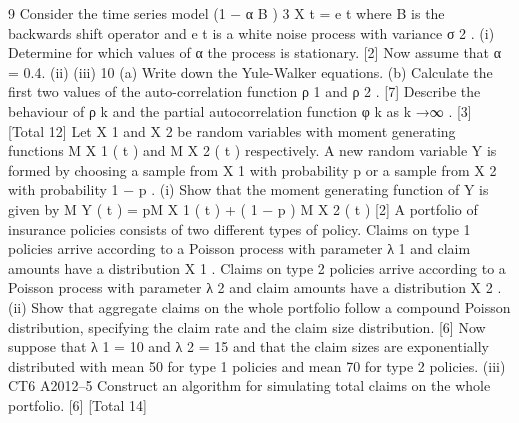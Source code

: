 \documentclass[a4paper,12pt]{article}
\begin{document}
\begin{enumerate}
9
Consider the time series model
(1 − α B ) 3 X t = e t
where B is the backwards shift operator and e t is a white noise process with variance
σ 2 .
(i)
Determine for which values of α the process is stationary.
[2]
Now assume that α = 0.4.
(ii)
(iii)
10
(a) Write down the Yule-Walker equations.
(b) Calculate the first two values of the auto-correlation function ρ 1 and
ρ 2 .
[7]
Describe the behaviour of ρ k and the partial autocorrelation function φ k as
k →∞ .
[3]
[Total 12]
Let X 1 and X 2 be random variables with moment generating functions M X 1 ( t ) and
M X 2 ( t ) respectively. A new random variable Y is formed by choosing a sample
from X 1 with probability p or a sample from X 2 with probability 1 − p .
(i)
Show that the moment generating function of Y is given by
M Y ( t ) = pM X 1 ( t ) + ( 1 − p ) M X 2 ( t )
[2]
A portfolio of insurance policies consists of two different types of policy. Claims on
type 1 policies arrive according to a Poisson process with parameter λ 1 and claim
amounts have a distribution X 1 . Claims on type 2 policies arrive according to a
Poisson process with parameter λ 2 and claim amounts have a distribution X 2 .
(ii)
Show that aggregate claims on the whole portfolio follow a compound Poisson
distribution, specifying the claim rate and the claim size distribution.
[6]
Now suppose that λ 1 = 10 and λ 2 = 15 and that the claim sizes are exponentially
distributed with mean 50 for type 1 policies and mean 70 for type 2 policies.
(iii)
CT6 A2012–5
Construct an algorithm for simulating total claims on the whole portfolio. [6]
[Total 14]


\end{enumerate}
\end{document}
